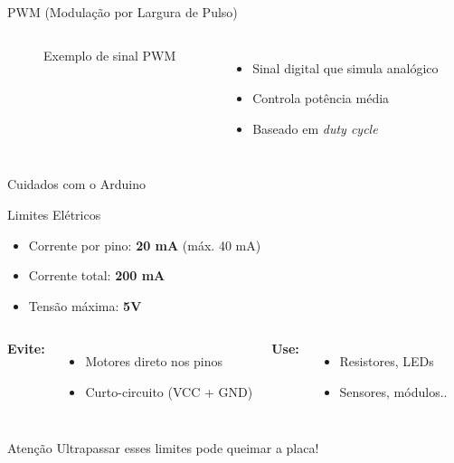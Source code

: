 \begin{frame}{PWM (Modulação por Largura de Pulso)}
  \begin{columns}
    \begin{figure}
      \centering
      \caption{Exemplo de sinal PWM}
    \end{figure}
    \begin{itemize}
      \item Sinal digital que simula analógico
      \item Controla potência média
      \item Baseado em \textit{duty cycle}
    \end{itemize}
  \end{columns}
\end{frame}

\begin{frame}{Cuidados com o Arduino}
  \begin{block}{Limites Elétricos}
    \begin{itemize}
      \item Corrente por pino: \textbf{20 mA} (máx. 40 mA)
      \item Corrente total: \textbf{200 mA}
      \item Tensão máxima: \textbf{5V}
    \end{itemize}
  \end{block}
  \begin{columns}[T]
    \textbf{Evite:}
    \begin{itemize}
      \item Motores direto nos pinos
      \item Curto-circuito (VCC + GND)
    \end{itemize}
    \textbf{Use:}
    \begin{itemize}
      \item Resistores, LEDs
      \item Sensores, módulos..
    \end{itemize}
  \end{columns}
  \begin{alertblock}{Atenção}
    Ultrapassar esses limites pode queimar a placa!
  \end{alertblock}
\end{frame}

